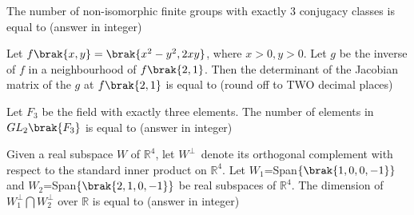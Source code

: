 \iffalse
\chapter{2024}
\author{EE24BTECH11037}
\section{ma}
\fi

    \item The number of non-isomorphic finite groups with exactly $3$ conjugacy classes is equal to \underline{\hspace{1.5cm}}(answer in integer)
    \item Let $f\brak{x,y}=\brak{x^2-y^2,2xy}$, where $x>0,y>0$. Let $g$ be the inverse of $f$ in a neighbourhood of $f\brak{2,1}$. Then the determinant of the Jacobian matrix of the $g$ at $f\brak{2,1}$ is equal to \underline{\hspace{1.5cm}}(round off to TWO decimal places)
    \item Let $F_3$ be the field with exactly three elements. The number of elements in $GL_2\brak{F_3}$ is equal to \underline{\hspace{1.5cm}}(answer in integer)
    \item Given a real subspace $W$ of $\mathbb{R}^4$, let $W^\perp$\ denote its orthogonal complement with respect to the standard inner product on $\mathbb{R}^4$. Let  $W_1$=Span$\{\brak{1,0,0,-1}\}$ and $W_2$=Span$\{\brak{2,1,0,-1}\}$ be real subspaces of $\mathbb{R}^4$. The dimension of $W_1^\perp\bigcap W_2^\perp$ over $\mathbb{R}$ is equal to \underline{\hspace{1.5cm}}(answer in integer)
    
